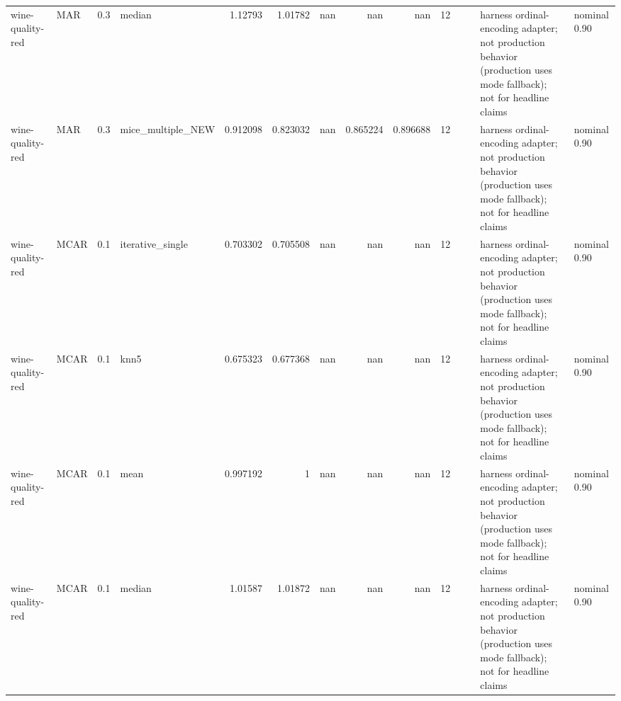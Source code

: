 \begin{table}[ht]
\begin{tabular}{llrlrrrrrrllll}
 wine-quality-red     & MAR         &         0.3 & median            &       1.12793  &             1.01782  &               nan        &                     nan        &                       nan        &        12 &                    &                                         & harness ordinal-encoding adapter; not production behavior (production uses mode fallback); not for headline claims & nominal 0.90              \\
 wine-quality-red     & MAR         &         0.3 & mice\_multiple\_NEW &       0.912098 &             0.823032 &               nan        &                       0.865224 &                         0.896688 &        12 &                    &                                         & harness ordinal-encoding adapter; not production behavior (production uses mode fallback); not for headline claims & nominal 0.90              \\
 wine-quality-red     & MCAR        &         0.1 & iterative\_single  &       0.703302 &             0.705508 &               nan        &                     nan        &                       nan        &        12 &                    &                                         & harness ordinal-encoding adapter; not production behavior (production uses mode fallback); not for headline claims & nominal 0.90              \\
 wine-quality-red     & MCAR        &         0.1 & knn5              &       0.675323 &             0.677368 &               nan        &                     nan        &                       nan        &        12 &                    &                                         & harness ordinal-encoding adapter; not production behavior (production uses mode fallback); not for headline claims & nominal 0.90              \\
 wine-quality-red     & MCAR        &         0.1 & mean              &       0.997192 &             1        &               nan        &                     nan        &                       nan        &        12 &                    &                                         & harness ordinal-encoding adapter; not production behavior (production uses mode fallback); not for headline claims & nominal 0.90              \\
 wine-quality-red     & MCAR        &         0.1 & median            &       1.01587  &             1.01872  &               nan        &                     nan        &                       nan        &        12 &                    &                                         & harness ordinal-encoding adapter; not production behavior (production uses mode fallback); not for headline claims & nominal 0.90              \\

\end{tabular}
\end{table}
